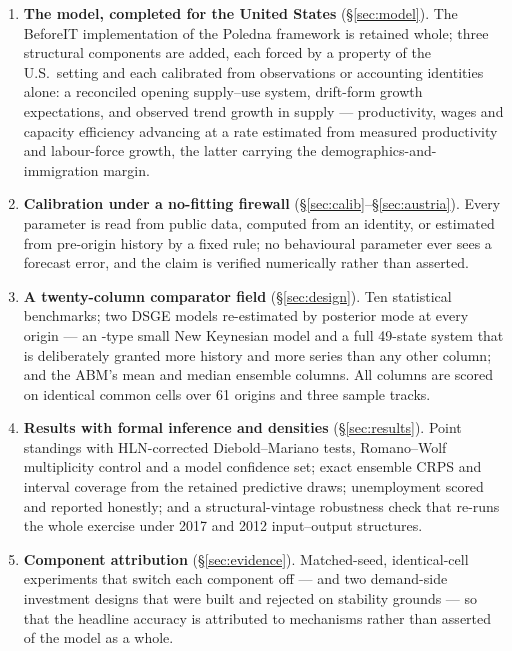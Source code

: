 \documentclass[11pt,a4paper]{article}
\begin{document}
\begin{enumerate}[leftmargin=1.4em,itemsep=2pt]
\item \textbf{The model, completed for the United States} (\S\ref{sec:model}). The BeforeIT
      implementation \citep{beforeit2025} of the Poledna framework is retained whole; three
      structural components are added, each forced by a property of the U.S.\ setting and each
      calibrated from observations or accounting identities alone: a reconciled opening
      supply--use system, drift-form growth expectations, and observed trend growth in supply ---
      productivity, wages and capacity efficiency advancing at a rate estimated from measured
      productivity and labour-force growth, the latter carrying the demographics-and-immigration
      margin.
\item \textbf{Calibration under a no-fitting firewall} (\S\ref{sec:calib}--\S\ref{sec:austria}).
      Every parameter is read from public data, computed from an identity, or estimated from
      pre-origin history by a fixed rule; no behavioural parameter ever sees a forecast error, and
      the claim is verified numerically rather than asserted.
\item \textbf{A twenty-column comparator field} (\S\ref{sec:design}). Ten statistical benchmarks;
      two DSGE models re-estimated by posterior mode at every origin --- an
      \citet{anschorfheide2007}-type small New Keynesian model and a full 49-state
      \citet{smetswouters2007} system that is deliberately granted more history and more series
      than any other column; and the ABM's mean and median ensemble columns. All columns are
      scored on identical common cells over 61 origins and three sample tracks.
\item \textbf{Results with formal inference and densities} (\S\ref{sec:results}). Point standings
      with HLN-corrected Diebold--Mariano tests, Romano--Wolf multiplicity control and a model
      confidence set; exact ensemble CRPS and interval coverage from the retained predictive
      draws; unemployment scored and reported honestly; and a structural-vintage robustness check
      that re-runs the whole exercise under 2017 and 2012 input--output structures.
\item \textbf{Component attribution} (\S\ref{sec:evidence}). Matched-seed, identical-cell
      experiments that switch each component off --- and two demand-side investment designs that
      were built and rejected on stability grounds --- so that the headline accuracy is
      attributed to mechanisms rather than asserted of the model as a whole.
\end{enumerate}
\end{document}
